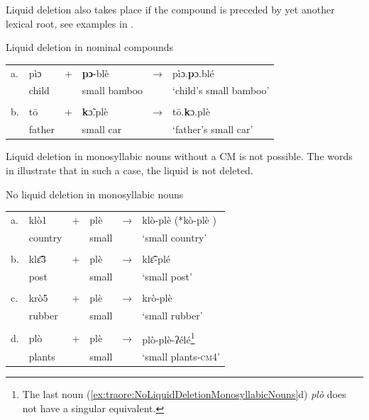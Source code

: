 \documentclass[output=paper]{langscibook}
\begin{document}
Liquid deletion also takes place if the compound is preceded by yet another lexical root, see examples in .

\begin{exe}
    \ex Liquid deletion in nominal compounds\label{ex:traore:compundPrecededByLexicalRoot:29}\\
    \begin{tabularx}{.8\textwidth}{l l l l l l}
    a. & pìɔ   &     +    &  \textbf{pɔ}{}-blè   &   →   &  pìɔ.\textbf{p}ɔ.blé\\
    & child   &       & small bamboo          &       & `child’s small bamboo'\\
                    &           &       &       &               \\
    b. & tō    &     +  & \textbf{k}ɔ̃.plè\-  &   →       & tō.\textbf{k}ɔ.plè \\
        & father  &       & small car         &           & `father’s small car' \\
    \end{tabularx}
\end{exe}

Liquid deletion in monosyllabic nouns without a CM is not possible. The words in  illustrate that in such a case, the liquid is not deleted.        
    \pagebreak
    \begin{exe}
        \ex No liquid deletion in monosyllabic nouns \label{ex:traore:NoLiquidDeletionMonosyllabicNouns}\\
        \begin{tabularx}{.7\textwidth}{l l l l l l }
        a. & klò1     &       +   &   plè    &   →  &        klò-plè (*kò-plè  )\\
        & country   &         &  small    &       &   `small country'\\
         &           &       &           &       &                   \\
        b. & klɛ̃̄3    &  +    &  plè     &   →  &    klɛ̃̄-plé\\   
        & post        &       &   small   &       & `small post'\\        
        &            &       &           &       &                   \\
        c. & krò5      &     +   &   plè     &   →   & krò-plè       \\             
        & rubber    &         & small     &       & `small rubber'\\  
        &            &       &           &       &                   \\
        d. & plò     &    +      & plè       &   →  &    plò-plè-ʔélé\footnote{The last noun (\ref{ex:traore:NoLiquidDeletionMonosyllabicNouns}d) \textit{plò} does not have a singular equivalent.}\\
        & plants   &          & small     &       & `small plants-\textsc{cm}4'\\ 
        \end{tabularx}
    \end{exe}
    
\end{document}
